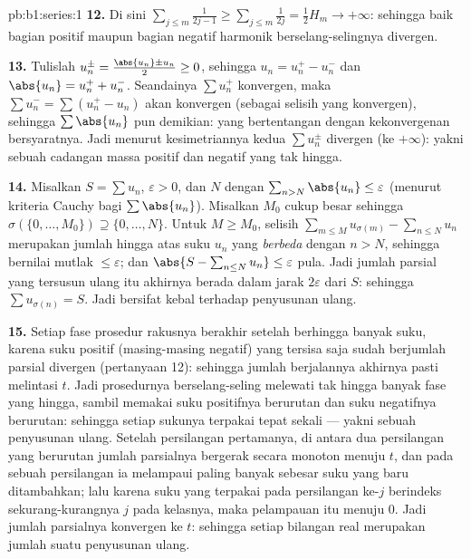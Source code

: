 \begin{solution}{pb:b1:series:1}
\textbf{12.} Di sini $\sum_{j\leq m} \frac{1}{2j-1} \geq \sum_{j \leq m}
\frac{1}{2j} = \frac12 H_m \to +\infty$: sehingga baik bagian positif maupun
bagian negatif  harmonik berselang-selingnya divergen.

\textbf{13.} Tulislah $u_n^\pm = \frac{\abs{u_n} \pm u_n}{2} \geq
0$, sehingga $u_n = u_n^+ - u_n^-$ dan $\abs{u_n} = u_n^+ + u_n^-$. Seandainya
$\sum u_n^+$ konvergen, maka $\sum u_n^- = \sum (u_n^+ - u_n)$
akan konvergen (sebagai selisih  yang konvergen), sehingga $\sum
\abs{u_n}$ pun demikian: yang bertentangan dengan kekonvergenan bersyaratnya. Jadi menurut
kesimetriannya kedua $\sum u_n^\pm$ divergen (ke $+\infty$): yakni sebuah
cadangan massa positif dan negatif yang tak hingga.

\textbf{14.} Misalkan $S = \sum u_n$, $\varepsilon > 0$, dan $N$ dengan
$\sum_{n > N} \abs{u_n} \leq \varepsilon$ (menurut kriteria Cauchy bagi
$\sum\abs{u_n}$). Misalkan $M_0$ cukup besar sehingga $\sigma(\{0,
\dots, M_0\}) \supseteq \{0, \dots, N\}$. Untuk $M \geq M_0$, selisih
$\sum_{m \leq M} u_{\sigma(m)} - \sum_{n \leq N} u_n$
merupakan jumlah hingga atas suku $u_n$ yang \emph{berbeda} dengan $n > N$,
sehingga bernilai mutlak $\leq \varepsilon$; dan $\abs{S -
\sum_{n\leq N} u_n} \leq \varepsilon$ pula. Jadi jumlah parsial yang tersusun
ulang itu akhirnya berada dalam jarak $2\varepsilon$ dari $S$:
sehingga $\sum u_{\sigma(n)} = S$. Jadi  bersifat
kebal terhadap penyusunan ulang.

\textbf{15.} Setiap fase prosedur rakusnya berakhir setelah
berhingga banyak suku, karena suku positif (masing-masing negatif)
yang tersisa saja sudah berjumlah parsial divergen
(pertanyaan 12): sehingga jumlah berjalannya akhirnya pasti melintasi $t$. Jadi
prosedurnya berselang-seling melewati tak hingga banyak fase yang hingga,
sambil memakai suku positifnya berurutan dan suku negatifnya
berurutan: sehingga setiap sukunya terpakai tepat sekali --- yakni sebuah penyusunan ulang.
Setelah persilangan pertamanya, di antara dua persilangan yang berurutan
jumlah parsialnya bergerak secara monoton menuju $t$, dan pada sebuah persilangan
ia melampaui paling banyak sebesar suku yang baru ditambahkan; lalu karena suku
yang terpakai pada persilangan ke-$j$ berindeks sekurang-kurangnya $j$ pada
kelasnya, maka pelampauan itu menuju $0$. Jadi jumlah parsialnya
konvergen ke $t$: sehingga setiap bilangan real merupakan jumlah suatu
penyusunan ulang.


\end{solution}
